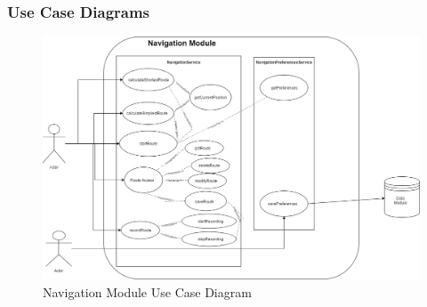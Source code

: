 \documentclass{article}
\begin{document}
        \subsubsection{Use Case Diagrams}
        \begin{figure}[!h]
        	\includegraphics[width=\textwidth]{Navigation_Use_Case_Diagram}
            \caption{Navigation Module Use Case Diagram}
        \end{figure}
\end{document}
